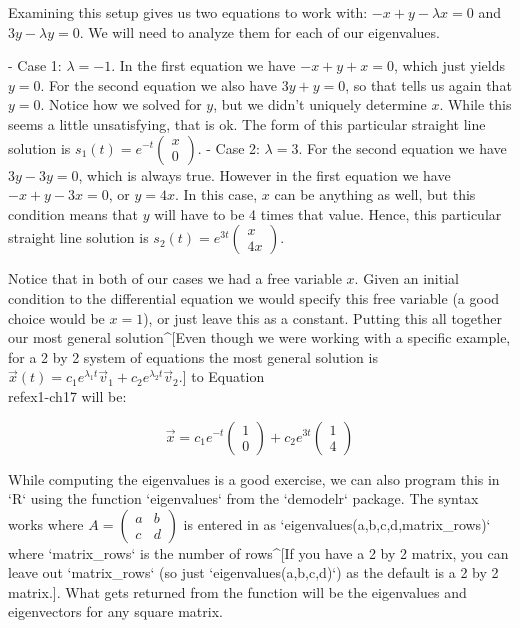 \documentclass[
]{book}
\theoremstyle{definition}
\theoremstyle{definition}
\theoremstyle{definition}
\theoremstyle{remark}
\begin{document}
Examining this setup gives us two equations to work with: $- x + y - \lambda x = 0$ and $3y-\lambda y =0$.  We will need to analyze them for each of our eigenvalues. 

- Case 1: $\lambda = -1$. In the first equation we have $-x+y+x =0$, which just yields $y=0$. For the second equation we also have $3y+y =0$, so that tells us again that $y=0$.  Notice how we solved for $y$, but we didn't uniquely determine $x$. While this seems a little unsatisfying, that is ok. The form of this particular straight line solution is $\displaystyle s_{1}(t)=e^{-t} \begin{pmatrix} x \\ 0 \end{pmatrix}$.
- Case 2: $\lambda = 3$. For the second equation we have $3y - 3y=0$, which is always true. However in the first equation we have $- x + y - 3x = 0$, or $y = 4x$.  In this case, $x$ can be anything as well, but this condition means that $y$ will have to be 4 times that value.  Hence, this particular straight line solution is $\displaystyle s_{2}(t)=e^{3t} \begin{pmatrix} x \\ 4x \end{pmatrix}$.

Notice that in both of our cases we had a free variable $x$.  Given an initial condition to the differential equation we would specify this free variable (a good choice would be $x=1$), or just leave this as a constant.  Putting this all together our most general solution^[Even though we were working with a specific example, for a 2 by 2 system of equations the most general solution is $\vec{x}(t) = c_{1} e^{\lambda_{1}t} \vec{v}_{1} + c_{2} e^{\lambda_{2}t} \vec{v}_{2}$.] to Equation \\ref{ex1-ch17} will be:

\begin{equation*}
\vec{x} = c_{1} e^{- t} \begin{pmatrix} 1 \\ 0 \end{pmatrix}  + c_{2} e^{3t} \begin{pmatrix} 1 \\ 4 \end{pmatrix}
\end{equation*}



While computing the eigenvalues is a good exercise, we can also program this in `R` using the function `eigenvalues` from the `demodelr` package. The syntax works where $\displaystyle A = \begin{pmatrix} a & b \\ c & d \end{pmatrix}$ is entered in as `eigenvalues(a,b,c,d,matrix_rows)` where `matrix_rows` is the number of rows^[If you have a 2 by 2 matrix, you can leave out `matrix_rows` (so just `eigenvalues(a,b,c,d)`) as the default is a 2 by 2 matrix.]. What gets returned from the function will be the eigenvalues and eigenvectors for any square matrix.
\end{document}
